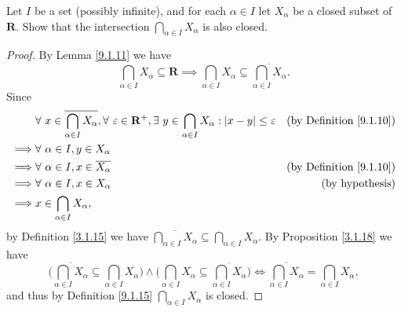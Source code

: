 \begin{exercise}\label{ex 9.1.8}
    Let \(I\) be a set (possibly infinite), and for each \(\alpha \in I\) let \(X_{\alpha}\) be a closed subset of \(\mathbf{R}\).
    Show that the intersection \(\bigcap_{\alpha \in I} X_{\alpha}\) is also closed.
\end{exercise}

\begin{proof}
    By Lemma \ref{9.1.11} we have
    \[
        \bigcap_{\alpha \in I} X_{\alpha} \subseteq \mathbf{R} \implies \bigcap_{\alpha \in I} X_{\alpha} \subseteq \overline{\bigcap_{\alpha \in I} X_{\alpha}}.
    \]
    Since
    \begin{align*}
                 & \forall\ x \in \overline{\bigcap_{\alpha \in I} X_{\alpha}}, \forall\ \varepsilon \in \mathbf{R}^+, \exists\ y \in \bigcap_{\alpha \in I} X_{\alpha} : \abs*{x - y} \leq \varepsilon & \text{(by Definition \ref{9.1.10})} \\
        \implies & \forall\ \alpha \in I, y \in X_{\alpha}                                                                                                                                                                                    \\
        \implies & \forall\ \alpha \in I, x \in \overline{X_{\alpha}}                                                                                                                                   & \text{(by Definition \ref{9.1.10})} \\
        \implies & \forall\ \alpha \in I, x \in X_{\alpha}                                                                                                                                              & \text{(by hypothesis)}              \\
        \implies & x \in \bigcap_{\alpha \in I} X_{\alpha},
    \end{align*}
    by Definition \ref{3.1.15} we have \(\overline{\bigcap_{\alpha \in I} X_{\alpha}} \subseteq \bigcap_{\alpha \in I} X_{\alpha}\).
    By Proposition \ref{3.1.18} we have
    \[
        \bigg(\overline{\bigcap_{\alpha \in I} X_{\alpha}} \subseteq \bigcap_{\alpha \in I} X_{\alpha}\bigg) \land \bigg(\bigcap_{\alpha \in I} X_{\alpha} \subseteq \overline{\bigcap_{\alpha \in I} X_{\alpha}}\bigg) \iff \overline{\bigcap_{\alpha \in I} X_{\alpha}} = \bigcap_{\alpha \in I} X_{\alpha},
    \]
    and thus by Definition \ref{9.1.15} \(\bigcap_{\alpha \in I} X_{\alpha}\) is closed.
\end{proof}

